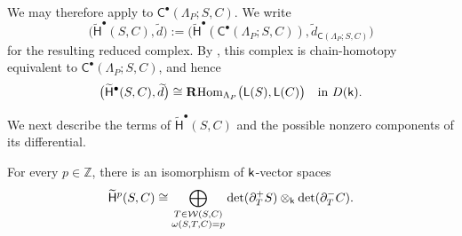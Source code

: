 We may therefore apply
 to
$\mathsf C^\bullet(\Lambda_P;S,C)$.  
We write
\begin{equation}
\label{eq:ss-reduced-simple-simple-complex}
\bigl(
\widetilde{\mathsf H}^\bullet(S,C),
\widetilde d
\bigr)
:=
\bigl(
\widetilde{\mathsf H}^\bullet
    (\mathsf C^\bullet(\Lambda_P;S,C)),
\widetilde d_{\mathsf C(\Lambda_P;S,C)}
\bigr)
\end{equation}
for the resulting reduced complex.
By , this complex is
chain-homotopy equivalent to
$\mathsf C^\bullet(\Lambda_P;S,C)$, and hence
\begin{equation}
\label{eq:ss-reduced-simple-simple-derived-hom}
\bigl(
\widetilde{\mathsf H}^\bullet(S,C),
\widetilde d
\bigr)
\cong
\mathbf R\!\operatorname{Hom}_{\Lambda_P}\bigl(\mathsf L(S),\mathsf L(C)\bigr)
\quad\text{in }D(\mathsf{k}).
\end{equation}

We next describe the terms of
$\widetilde{\mathsf H}^\bullet(S,C)$ and the possible nonzero
components of its differential.

\begin{proposition}
\label{prop:ss-exact-support-reduced-terms}
For every $p\in\mathbb Z$, there is an isomorphism of
$\mathsf{k}$-vector spaces
\begin{equation}
\label{eq:ss-exact-support-reduced-terms}
\widetilde{\mathsf H}^p(S,C)
\cong
\bigoplus_{\substack{T\in\mathcal W(S,C)\\
\omega(S,T,C)=p}}
\det(\partial_T^+S)
\otimes_{\mathsf{k}}
\det(\partial_T^-C).
\end{equation}
\end{proposition}

